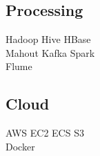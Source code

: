 \documentclass[letterpaper]{deedy-resume} %
\begin{document}
\begin{minipage}[t]{0.33\textwidth}
\sectionspace %

\subsection{Processing}

Hadoop \textbullet{} Hive \textbullet{} HBase \\
Mahout \textbullet{} Kafka \textbullet{} Spark \\
Flume 

\sectionspace %

\subsection{Cloud}

AWS \textbullet{} EC2 \textbullet{} ECS \textbullet{} S3 \\
Docker \textbullet{} 


\end{minipage} %
\hfill
%
%
\end{document}
